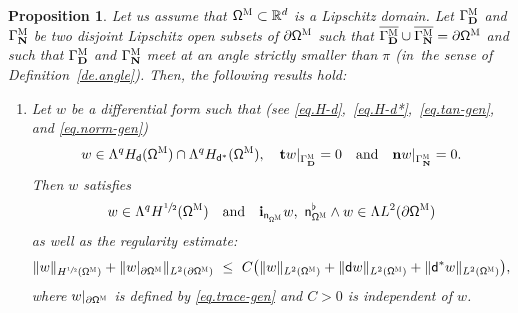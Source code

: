 \documentclass[JEP,XML,SOM,Unicode,NoEqCountersInSection,NoFloatCountersInSection,published]{cedram}
\newenvironment{enumeratei}
{\bgroup\def\theenumi{\roman{enumi}}\def\theenumii{\arabic{enumii}}\begin{enumerate}}
{\end{enumerate}\egroup}
\newcommand{\quand}{\quad\text{and}\quad}
\newcommand{\mbf}[1]{\mathbf{#1}}
\let\pa\partial
\theoremstyle{plain}
\newtheorem{proposition}{Proposition}
\theoremstyle{definition}
\begin{document}
\begin{proposition}
\label{pr.QTN}
Let us assume that $\mathsf \Omega^{\textsc{M}}\subset \mathbb R^d$ is a Lipschitz domain. Let $\Gamma^{\textsc{M}}_{\mbf D}$
and $\Gamma^{\textsc{M}}_{\mbf N}$ be two disjoint Lipschitz open subsets of $\partial \mathsf \Omega^{\textsc{M}}$ such that $\overline{\Gamma^{\textsc{M}}_{\mbf D}} \cup \overline{\Gamma^{\textsc{M}}_{\mbf N}} = \pa
\mathsf \Omega^{\textsc{M}}$ and such that $\Gamma^{\textsc{M}}_{\mbf D}$ and $\Gamma^{\textsc{M}}_{\mbf N}$ meet at an angle
strictly smaller than $\pi$ (in~the sense of Definition~\ref{de.angle}). Then, the following results hold:

\begin{enumeratei}
\item\label{pr.QTNi}
Let $w$ be a differential form such that (see \eqref{eq.H-d},~\eqref{eq.H-d*},~\eqref{eq.tan-gen}, and \eqref{eq.norm-gen})
\[
w\in \Lambda^qH_{\mathsf d}(\mathsf \Omega^{\textsc{M}})\cap \Lambda^qH_{\mathsf d^*}(\mathsf \Omega^{\textsc{M}}), \quad
\mathbf t w|_{\Gamma^{\textsc{M}}_{\mbf D}}=0 \quand 
\mathbf n w|_{\Gamma^{\textsc{M}}_{\mbf N}}=0.
\]
Then $w$ satisfies
\[
w\in\Lambda^{q} H^{\sfrac12} (\mathsf \Omega^{\textsc{M}})\quand
\mathbf{i}_{\mathsf n_{\mathsf \Omega^{\textsc{M}}}} w,\ \mathsf n_{\mathsf \Omega^{\textsc{M}}}^{\flat} \wedge w \in
\Lambda L^2 (\pa\mathsf \Omega^{\textsc{M}})
\]
as well as the regularity estimate:
\begin{equation}\label{eq:subelliptic}
\|w\|_{ H^{\sfrac12} (\mathsf \Omega^{\textsc{M}})}+
\|w|_{\pa\mathsf \Omega^{\textsc{M}}}\|_{ L^{2} (\pa\mathsf \Omega^{\textsc{M}})}\
\leq\ C\bigl(\|w\|_{ L^{2} (\mathsf \Omega^{\textsc{M}})}
+\|\mathsf d w\|_{ L^{2} (\mathsf \Omega^{\textsc{M}})}+\|\mathsf d^*w\|_{ L^{2} (\mathsf \Omega^{\textsc{M}})} \bigr),
\end{equation}
where $w|_{\pa\mathsf \Omega^{\textsc{M}}}$ is defined by \eqref{eq.trace-gen} and $C>0$ is independent of $w$.


\end{enumeratei}
\end{proposition}
\end{document}
